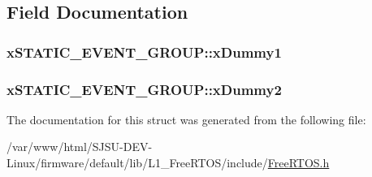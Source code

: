 \subsection{Field Documentation}
\subsubsection[{\texorpdfstring{x\+Dummy1}{xDummy1}}]{ x\+S\+T\+A\+T\+I\+C\+\_\+\+E\+V\+E\+N\+T\+\_\+\+G\+R\+O\+U\+P\+::x\+Dummy1}\hypertarget{structxSTATIC__EVENT__GROUP_a4ed0094f715dd8f79a354f42fd973fc6}{}\label{structxSTATIC__EVENT__GROUP_a4ed0094f715dd8f79a354f42fd973fc6}
\subsubsection[{\texorpdfstring{x\+Dummy2}{xDummy2}}]{ x\+S\+T\+A\+T\+I\+C\+\_\+\+E\+V\+E\+N\+T\+\_\+\+G\+R\+O\+U\+P\+::x\+Dummy2}\hypertarget{structxSTATIC__EVENT__GROUP_a17d070c972ecd0151d7505a539653551}{}\label{structxSTATIC__EVENT__GROUP_a17d070c972ecd0151d7505a539653551}


The documentation for this struct was generated from the following file\+:\begin{DoxyCompactItemize}
\item 
/var/www/html/\+S\+J\+S\+U-\/\+D\+E\+V-\/\+Linux/firmware/default/lib/\+L1\+\_\+\+Free\+R\+T\+O\+S/include/\hyperlink{FreeRTOS_8h}{Free\+R\+T\+O\+S.\+h}\end{DoxyCompactItemize}

